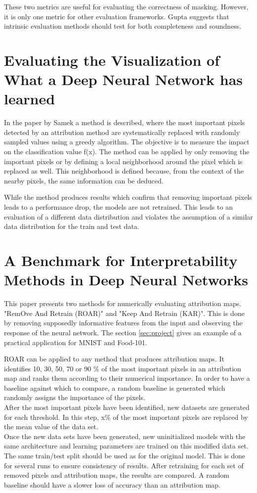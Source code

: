 These two metrics are useful for evaluating the correctness of masking. However, it is only one metric for other evaluation frameworks. Gupta suggests that intrinsic evaluation methods should test for both completeness and soundness.

\section{Evaluating the Visualization of What a Deep Neural Network has learned}
\label{pertubation}

In the paper by Samek\cite{samek2017} a method is described, where the most important pixels detected by an attribution method are systematically replaced with randomly sampled values using a greedy algorithm. The objective is to measure the impact on the classification value f(x). The method can be applied by only removing the important pixels or by defining a local neighborhood around the pixel which is replaced as well. This neighborhood is defined because, from the context of the nearby pixels, the same information can be deduced.

While the method produces results which confirm that removing important pixels leads to a performance drop, the models are not retrained. This leads to an evaluation of a different data distribution and violates the assumption of a similar data distribution for the train and test data.

\section{A Benchmark for Interpretability Methods in Deep Neural Networks }

This paper \cite{hooker2019benchmark} presents two methods for numerically evaluating attribution maps. "RemOve And Retrain (ROAR)" and "Keep And Retrain (KAR)". This is done by removing supposedly informative features from the input and observing the response of the neural network. The section \ref{sec:project} gives an example of a practical application for MNIST\cite{deng2012mnist} and Food-101\cite{bossard14}.


ROAR can be applied to any method that produces attribution maps. It identifies 10, 30, 50, 70 or 90 \% of the most important pixels in an attribution map and ranks them according to their numerical importance. In order to have a baseline against which to compare, a random baseline is generated which randomly assigns the importance of the pixels.\\ After the most important pixels have been identified, new datasets are generated for each threshold. In this step, x\% of the most important pixels are replaced by the mean value of the data set.\\
Once the new data sets have been generated, new uninitialized models with the same architecture and learning parameters are trained on this modified data set. The same train/test split should be used as for the original model. This is done for several runs to ensure consistency of results.
After retraining for each set of removed pixels and attribution maps, the results are compared. A random baseline should have a slower loss of accuracy than an attribution map.

